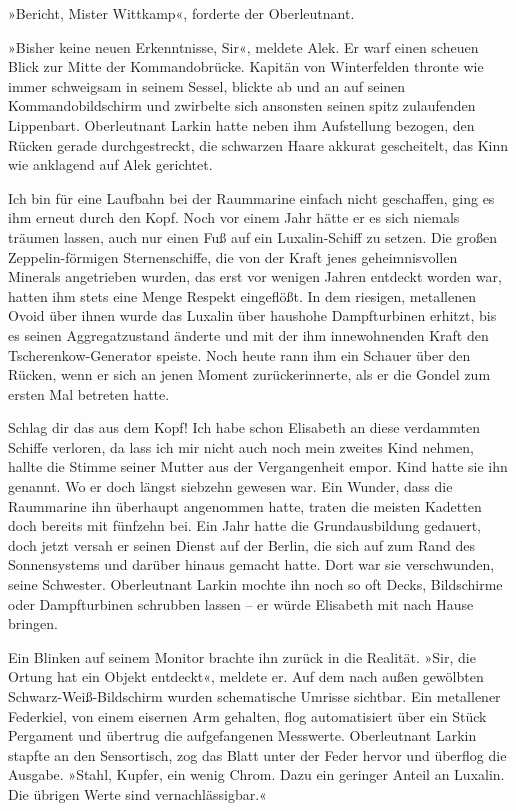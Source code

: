 »Bericht, Mister Wittkamp«, forderte der Oberleutnant.

»Bisher keine neuen Erkenntnisse, Sir«, meldete Alek. Er warf einen
scheuen Blick zur Mitte der Kommandobrücke. Kapitän von
Winterfelden thronte wie immer schweigsam in seinem Sessel, blickte
ab und an auf seinen Kommandobildschirm und zwirbelte sich
ansonsten seinen spitz zulaufenden Lippenbart. Oberleutnant Larkin
hatte neben ihm Aufstellung bezogen, den Rücken gerade
durchgestreckt, die schwarzen Haare akkurat gescheitelt, das Kinn
wie anklagend auf Alek gerichtet.

Ich bin für eine Laufbahn bei der Raummarine einfach nicht
geschaffen, ging es ihm erneut durch den Kopf. Noch vor einem Jahr
hätte er es sich niemals träumen lassen, auch nur einen Fuß auf ein
Luxalin-Schiff zu setzen. Die großen Zeppelin-förmigen
Sternenschiffe, die von der Kraft jenes geheimnisvollen Minerals
angetrieben wurden, das erst vor wenigen Jahren entdeckt worden
war, hatten ihm stets eine Menge Respekt eingeflößt. In dem
riesigen, metallenen Ovoid über ihnen wurde das Luxalin über
haushohe Dampfturbinen erhitzt, bis es seinen Aggregatzustand
änderte und mit der ihm innewohnenden Kraft den
Tscherenkow-Generator speiste. Noch heute rann ihm ein Schauer über
den Rücken, wenn er sich an jenen Moment zurückerinnerte, als er
die Gondel zum ersten Mal betreten hatte.

Schlag dir das aus dem Kopf! Ich habe schon Elisabeth an diese
verdammten Schiffe verloren, da lass ich mir nicht auch noch mein
zweites Kind nehmen, hallte die Stimme seiner Mutter aus der
Vergangenheit empor. Kind hatte sie ihn genannt. Wo er doch längst
siebzehn gewesen war. Ein Wunder, dass die Raummarine ihn überhaupt
angenommen hatte, traten die meisten Kadetten doch bereits mit
fünfzehn bei. Ein Jahr hatte die Grundausbildung gedauert, doch
jetzt versah er seinen Dienst auf der Berlin, die sich auf zum Rand
des Sonnensystems und darüber hinaus gemacht hatte. Dort war sie
verschwunden, seine Schwester. Oberleutnant Larkin mochte ihn noch
so oft Decks, Bildschirme oder Dampfturbinen schrubben lassen – er
würde Elisabeth mit nach Hause bringen.

Ein Blinken auf seinem Monitor brachte ihn zurück in die Realität.
»Sir, die Ortung hat ein Objekt entdeckt«, meldete er. Auf dem nach
außen gewölbten Schwarz-Weiß-Bildschirm wurden schematische Umrisse
sichtbar. Ein metallener Federkiel, von einem eisernen Arm
gehalten, flog automatisiert über ein Stück Pergament und übertrug
die aufgefangenen Messwerte. Oberleutnant Larkin stapfte an den
Sensortisch, zog das Blatt unter der Feder hervor und überflog die
Ausgabe. »Stahl, Kupfer, ein wenig Chrom. Dazu ein geringer Anteil
an Luxalin. Die übrigen Werte sind vernachlässigbar.«

